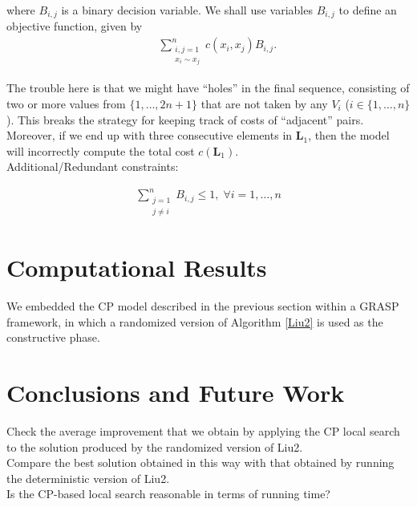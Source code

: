 \documentclass{llncs}
\begin{document}
\noindent where $B_{i,j}$ is a binary decision variable. We shall use variables $B_{i,j}$ to define an objective function, given by
\begin{eqnarray}
&& \sum_{\substack{i,j=1 \\ x_i \sim x_j}}^n c(x_i,x_j) B_{i,j}.
\end{eqnarray}

{\color{red}The trouble here is that we might have ``holes'' in the final sequence, consisting of two or more values from $\{1,\ldots,2n+1\}$ that are not taken by any $V_i$ ($i \in \{1,\ldots,n\}$). This breaks the strategy for keeping track of costs of ``adjacent'' pairs.\\


Moreover, if we end up with three consecutive elements in $\mathbf{L}_1$, then the model will incorrectly compute the total cost $c(\mathbf{L}_1)$.}\\

Additional/Redundant constraints:

\begin{eqnarray}
\sum_{\substack{j=1 \\ j \neq i}}^n B_{i,j} \leq 1, \; \forall i=1,\ldots,n
\end{eqnarray}

\section{Computational Results}

We embedded the CP model described in the previous section within a GRASP framework, in which a randomized version of Algorithm \ref{Liu2} is used as the constructive phase.

\section{Conclusions and Future Work}

Check the average improvement that we obtain by applying the CP local search to the solution produced by the randomized version of Liu2.\\

Compare the best solution obtained in this way with that obtained by running the deterministic version of Liu2.\\

Is the CP-based local search reasonable in terms of running time?
\end{document}
